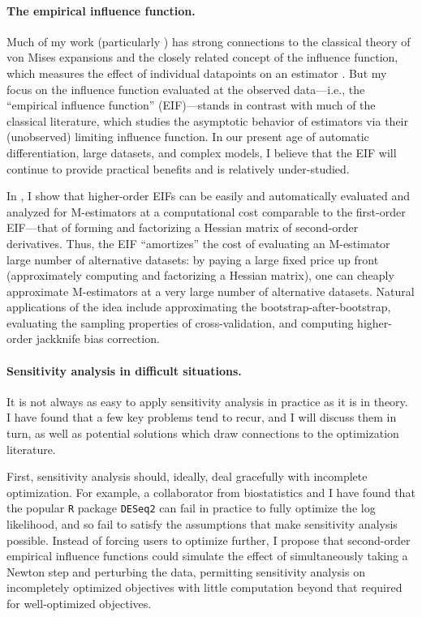 \paragraph{The empirical influence function.}
%
Much of my work (particularly \citet{giordano:2019:ij, giordano:2020:amip,
giordano:2021:bayesij}) has strong connections to the classical theory of von
Mises expansions and the closely related concept of the influence function,
which measures the effect of individual datapoints on an estimator
\citep{mises:1947:asymptotic, hampel:1986:robustbook}.  But my focus on the influence function
evaluated at the observed data---i.e., the ``empirical influence function''
(EIF)---stands in contrast with much of the classical literature, which studies
the asymptotic behavior of estimators via their (unobserved) limiting influence
function.
%
In our present age of automatic differentiation, large datasets, and complex
models, I believe that the EIF will continue to provide practical benefits and
is relatively under-studied.

In \citet{giordano:2019:hoij}, I show that higher-order EIFs can be
easily and automatically evaluated and analyzed for M-estimators at a
computational cost comparable to the first-order EIF---that of forming and
factorizing a Hessian matrix of second-order derivatives.
%
Thus, the EIF ``amortizes'' the cost of evaluating an M-estimator large number
of alternative datasets: by paying a large fixed price up front (approximately
computing and factorizing a Hessian matrix), one can cheaply approximate
M-estimators at a very large number of alternative datasets.  Natural
applications of the idea include approximating the bootstrap-after-bootstrap,
evaluating the sampling properties of cross-validation, and computing
higher-order jackknife bias correction.

\paragraph{Sensitivity analysis in difficult situations.}
%
It is not always as easy to apply sensitivity analysis in practice as it is in
theory.  I have found that a few key problems tend to recur, and I will discuss
them in turn, as well as potential solutions which draw connections to the
optimization literature.

First, sensitivity analysis should, ideally, deal gracefully with incomplete
optimization.  For example, a collaborator from biostatistics and I have found
that the popular \texttt{R} package \texttt{DESeq2} can fail in practice to
fully optimize the log likelihood, and so fail to satisfy the assumptions that
make sensitivity analysis possible.  Instead of forcing users to optimize
further, I propose that second-order empirical influence functions could
simulate the effect of simultaneously taking a Newton step and perturbing the
data, permitting sensitivity analysis on incompletely optimized objectives with
little computation beyond that required for well-optimized objectives.

